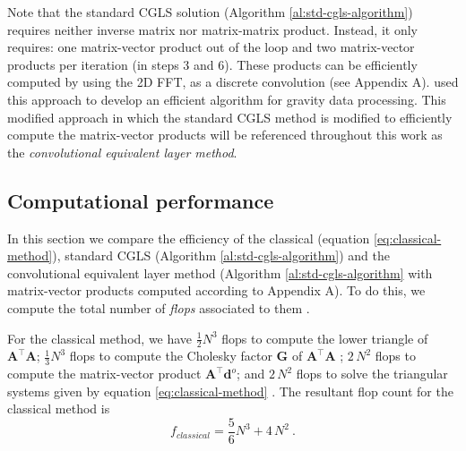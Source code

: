 \documentclass[manuscript]{geophysics}
\begin{document}
Note that the standard CGLS solution (Algorithm \ref{al:std-cgls-algorithm}) requires 
neither inverse matrix nor matrix-matrix product. Instead, it only requires: one matrix-vector 
product out of the loop and two matrix-vector products per iteration (in steps 3 and 6). 
These products can be efficiently computed by using the 2D FFT, as a discrete convolution
(see Appendix A). \citet{takahashi2020convolutional} used this approach
to develop an efficient algorithm for gravity data processing. This modified approach in which
the standard CGLS method is modified to efficiently compute the matrix-vector products will be 
referenced throughout this work as the \textit{convolutional equivalent layer method}.

\subsection{Computational performance}

In this section we compare the efficiency of the classical (equation \ref{eq:classical-method}), 
standard CGLS (Algorithm \ref{al:std-cgls-algorithm}) and the convolutional equivalent 
layer method (Algorithm \ref{al:std-cgls-algorithm} with matrix-vector products computed 
according to Appendix A). To do this, we compute the total number of 
\textit{flops} associated to them \citep[][ p. 12]{golub-vanloan2013}.

For the classical method, we have $\tfrac{1}{2} N^3$ flops to compute the lower triangle of
$\mathbf{A}^{\top}\mathbf{A}$; $\tfrac{1}{3} N^3$ flops to compute the Cholesky factor
$\mathbf{G}$ of $\mathbf{A}^{\top}\mathbf{A}$ \citep[][ p.~164]{golub-vanloan2013};
$2 \, N^2$ flops to compute the matrix-vector product $\mathbf{A}^{\top} \mathbf{d}^{o}$;
and $2 \, N^2$ flops to solve the triangular systems given by equation \ref{eq:classical-method}
\citep[][ p.~106]{golub-vanloan2013}. The resultant flop count for the classical method is
\begin{equation}
	f_{classical} =  \dfrac{5}{6} N^{3} + 4 \, N^{2}\: .
	\label{eq:flops-classical-method}
\end{equation}

\end{document}
